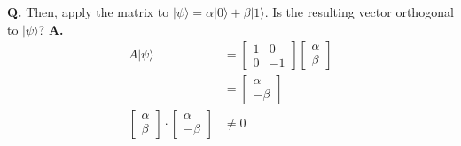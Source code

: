 \documentclass[main.tex]{subfiles}
\begin{document}
\begin{enumerate}
    \textbf{Q.} Then, apply the matrix to $|\psi\rangle=\alpha|0\rangle+\beta|1\rangle$. Is the resulting vector orthogonal to $|\psi\rangle$? \textbf{A.}
    \begin{align*}
        A|\psi\rangle                                                       & = \left[\begin{array}{ll} 1 & 0 \\ 0 & -1 \end{array}\right] \left[\begin{array}{c} \alpha \\ \beta \end{array}\right]\\
                                                                            & = \left[\begin{array}{c} \alpha \\ -\beta \end{array}\right]\\
        \left[\begin{array}{c} \alpha \\ \beta \end{array}\right] 
        \cdot \left[\begin{array}{c} \alpha \\ -\beta \end{array}\right]    & \neq 0 \tag{not orthogonal, missing something}\\
    \end{align*}


\end{enumerate}
\end{document}
